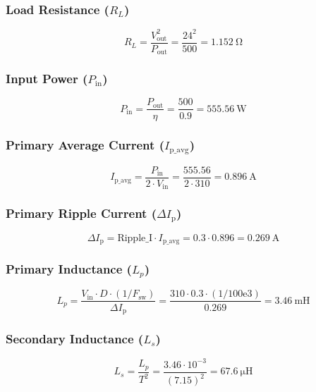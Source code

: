 \subsubsection*{Load Resistance (\(R_L\))}
\begin{equation}
R_L = \frac{V_{\text{out}}^2}{P_{\text{out}}} = \frac{24^2}{500} = \boxed{\SI{1.152}{\ohm}}
\end{equation}

\subsubsection*{Input Power (\(P_{\text{in}}\))}
\begin{equation}
P_{\text{in}} = \frac{P_{\text{out}}}{\eta} = \frac{500}{0.9} = \boxed{\SI{555.56}{\watt}}
\end{equation}

\subsubsection*{Primary Average Current (\(I_{\text{p\_avg}}\))}
\begin{equation}
I_{\text{p\_avg}} = \frac{P_{\text{in}}}{2 \cdot V_{\text{in}}} = \frac{555.56}{2 \cdot 310} = \boxed{\SI{0.896}{\ampere}}
\end{equation}

\subsubsection*{Primary Ripple Current (\(\Delta I_{\text{p}}\))}
\begin{equation}
\Delta I_{\text{p}} = \text{Ripple\_I} \cdot I_{\text{p\_avg}} = 0.3 \cdot 0.896 = \boxed{\SI{0.269}{\ampere}}
\end{equation}

\subsubsection*{Primary Inductance (\(L_p\))}
\begin{equation}
L_p = \frac{V_{\text{in}} \cdot D \cdot (1/F_{\text{sw}})}{\Delta I_{\text{p}}} = \frac{310 \cdot 0.3 \cdot (1/100\text{e}3)}{0.269} = \boxed{\SI{3.46}{\milli\henry}}
\end{equation}

\subsubsection*{Secondary Inductance (\(L_s\))}
\begin{equation}
L_s = \frac{L_p}{T^2} = \frac{3.46 \cdot 10^{-3}}{(7.15)^2} = \boxed{\SI{67.6}{\micro\henry}}
\end{equation}

